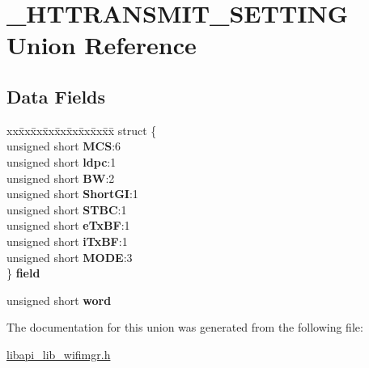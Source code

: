 \hypertarget{union__HTTRANSMIT__SETTING}{}\section{\+\_\+\+H\+T\+T\+R\+A\+N\+S\+M\+I\+T\+\_\+\+S\+E\+T\+T\+I\+NG Union Reference}
\label{union__HTTRANSMIT__SETTING}
\subsection*{Data Fields}
\begin{DoxyCompactItemize}
\item 
\mbox{\label{union__HTTRANSMIT__SETTING_ab8018e5491b4cf2be4bd012e2ba7bec8}} 
\begin{tabbing}
xx\=xx\=xx\=xx\=xx\=xx\=xx\=xx\=xx\=\kill
struct \{\\
\>unsigned short {\bfseries MCS}:6\\
\>unsigned short {\bfseries ldpc}:1\\
\>unsigned short {\bfseries BW}:2\\
\>unsigned short {\bfseries ShortGI}:1\\
\>unsigned short {\bfseries STBC}:1\\
\>unsigned short {\bfseries eTxBF}:1\\
\>unsigned short {\bfseries iTxBF}:1\\
\>unsigned short {\bfseries MODE}:3\\
\} {\bfseries field}\\

\end{tabbing}\item 
\mbox{\label{union__HTTRANSMIT__SETTING_a5a60725951ec6d9f32634973b8a9b89b}} 
unsigned short {\bfseries word}
\end{DoxyCompactItemize}


The documentation for this union was generated from the following file\+:\begin{DoxyCompactItemize}
\item 
\hyperlink{libapi__lib__wifimgr_8h}{libapi\+\_\+lib\+\_\+wifimgr.\+h}\end{DoxyCompactItemize}
